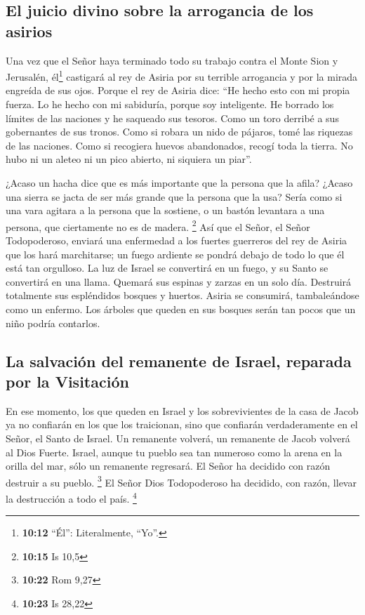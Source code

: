 \hypertarget{el-juicio-divino-sobre-la-arrogancia-de-los-asirios}{%
\subsection{El juicio divino sobre la arrogancia de los
asirios}\label{el-juicio-divino-sobre-la-arrogancia-de-los-asirios}}

 Una vez que el Señor haya terminado todo su trabajo
contra el Monte Sion y Jerusalén, él\footnote{\textbf{10:12} ``Él'':
  Literalmente, ``Yo''.} castigará al rey de Asiria por su terrible
arrogancia y por la mirada engreída de sus ojos.  Porque
el rey de Asiria dice: ``He hecho esto con mi propia fuerza. Lo he hecho
con mi sabiduría, porque soy inteligente. He borrado los límites de las
naciones y he saqueado sus tesoros. Como un toro derribé a sus
gobernantes de sus tronos.  Como si robara un nido de
pájaros, tomé las riquezas de las naciones. Como si recogiera huevos
abandonados, recogí toda la tierra. No hubo ni un aleteo ni un pico
abierto, ni siquiera un piar''.

 ¿Acaso un hacha dice que es más importante que la
persona que la afila? ¿Acaso una sierra se jacta de ser más grande que
la persona que la usa? Sería como si una vara agitara a la persona que
la sostiene, o un bastón levantara a una persona, que ciertamente no es
de madera. \footnote{\textbf{10:15} Is 10,5}  Así que el
Señor, el Señor Todopoderoso, enviará una enfermedad a los fuertes
guerreros del rey de Asiria que los hará marchitarse; un fuego ardiente
se pondrá debajo de todo lo que él está tan orgulloso. 
La luz de Israel se convertirá en un fuego, y su Santo se convertirá en
una llama. Quemará sus espinas y zarzas en un solo día. 
Destruirá totalmente sus espléndidos bosques y huertos. Asiria se
consumirá, tambaleándose como un enfermo.  Los árboles
que queden en sus bosques serán tan pocos que un niño podría contarlos.

\hypertarget{la-salvaciuxf3n-del-remanente-de-israel-reparada-por-la-visitaciuxf3n}{%
\subsection{La salvación del remanente de Israel, reparada por la
Visitación}\label{la-salvaciuxf3n-del-remanente-de-israel-reparada-por-la-visitaciuxf3n}}

 En ese momento, los que queden en Israel y los
sobrevivientes de la casa de Jacob ya no confiarán en los que los
traicionan, sino que confiarán verdaderamente en el Señor, el Santo de
Israel.  Un remanente volverá, un remanente de Jacob
volverá al Dios Fuerte.  Israel, aunque tu pueblo sea tan
numeroso como la arena en la orilla del mar, sólo un remanente
regresará. El Señor ha decidido con razón destruir a su pueblo.
\footnote{\textbf{10:22} Rom 9,27}  El Señor Dios
Todopoderoso ha decidido, con razón, llevar la destrucción a todo el
país. \footnote{\textbf{10:23} Is 28,22}

